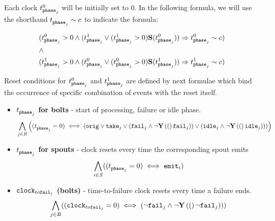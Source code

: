 Each clock $ t_{\mathtt{phase}_{j}}^{0} $ will be initially set to 0. 
In the following formula, we will use the shorthand $ t_{\mathtt{phase}_{j}}^{} \sim c$ to indicate the formula:


\begin{align*}
%
&  (\tph{j}{0} >  0 \land  (\tph{j}{1} \lor (\tph{j}{1} > 0) \Snc (\tph{j}{0})) \Rightarrow \tph{j}{0} \sim c )\\
%
& \land \\
%
& (\tph{j}{1} >  0 \land  (\tph{j}{0} \lor (\tph{j}{0} > 0) \Snc (\tph{j}{1})) \Rightarrow \tph{j}{1} \sim c )\\
%
\end{align*} 


Reset conditions for $t_{\mathtt{phase}_{j}}^{0}$ and $t_{\mathtt{phase}_{j}}^{1}$ are defined by next formulae which bind the occurrence of specific combination of events with the reset itself.

\begin{itemize}
 \item \textbf{ $ t_{\mathtt{phase}_{j}}^{} $ for bolts} - start of processing, failure or idle phase.
\begin{align*}
%
& \bigwedge_{
	\begin{subarray}{c}
	j \in B\\
	\end{subarray}
}
\left(
(\tph{j}{} =  0) \iff %
\left(\ori \lor \ta{j} \lor %
(\f{j} \land \lnot \Y (\f{j}) )  \lor %
(\id{j} \land \lnot \Y (\id{j}) ) \right) 
\right)\\ 
%
\end{align*} 
 \item \textbf{$ t_{\mathtt{phase}_{j}}^{} $ for spouts } - clock resets every time the corresponding spout emits
\begin{align*}
%
& \bigwedge_{
	\begin{subarray}{c}
	i \in S\\
	\end{subarray}
}
((\tph{j}{} =  0) \iff 
\e{i})\\ 
%
\end{align*} 
 \item \textbf{$ \mathtt{clock}_{to\mathtt{fail}_{j}} $ (bolts)} - time-to-failure clock resets every time a failure ends.
\begin{align*}
%
& \bigwedge_{
	\begin{subarray}{c}
	j \in B\\
	\end{subarray}
}
((\cltf{j} =  0) \iff 
 (\lnot \f{j} \land \lnot \Y (\lnot \f{j})))\\ 
%
\end{align*} 
\end{itemize}

